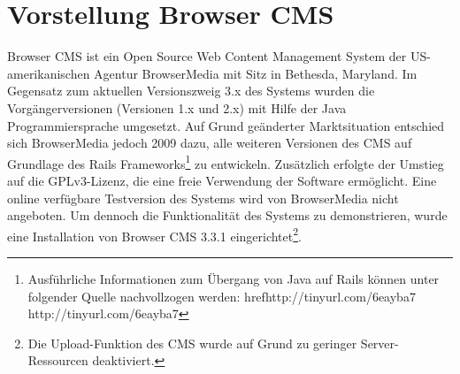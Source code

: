 \section{Vorstellung Browser CMS}
Browser CMS ist ein Open Source Web Content Management System der US-amerikanischen Agentur BrowserMedia mit Sitz in Bethesda, Maryland. Im Gegensatz zum aktuellen Versionszweig 3.x des Systems wurden die Vorgängerversionen (Versionen 1.x und 2.x) mit Hilfe der Java Programmiersprache umgesetzt.
Auf Grund geänderter Marktsituation entschied sich BrowserMedia jedoch 2009 dazu, alle weiteren Versionen des CMS auf Grundlage des Rails Frameworks\footnote{Ausführliche Informationen zum Übergang von Java auf Rails können unter folgender Quelle nachvollzogen werden: href{http://tinyurl.com/6eayba7
}{http://tinyurl.com/6eayba7}} zu entwickeln. Zusätzlich erfolgte der Umstieg auf die GPLv3-Lizenz, die eine freie Verwendung der Software ermöglicht.
Eine online verfügbare Testversion des Systems wird von BrowserMedia nicht angeboten. Um dennoch die Funktionalität des Systems zu demonstrieren, wurde eine Installation  von Browser CMS 3.3.1 eingerichtet\footnote{Die Upload-Funktion des CMS wurde auf Grund zu geringer Server-Ressourcen deaktiviert.}.
